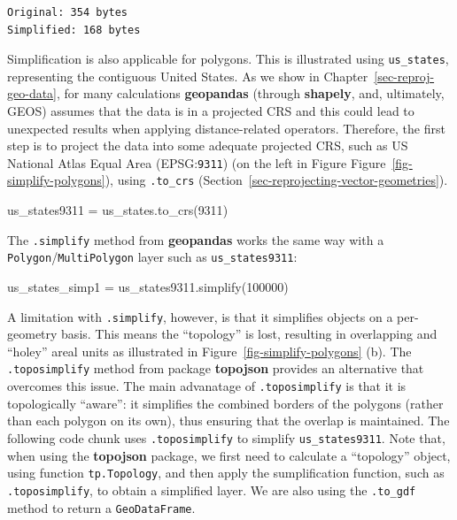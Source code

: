 \documentclass[
  letterpaper,
]{krantz}
\newenvironment{Shaded}{\begin{snugshade}}{\end{snugshade}}
\newcommand{\DecValTok}[1]{\textcolor[rgb]{0.68,0.00,0.00}{#1}}
\newcommand{\NormalTok}[1]{\textcolor[rgb]{0.00,0.23,0.31}{#1}}
\newcommand{\OperatorTok}[1]{\textcolor[rgb]{0.37,0.37,0.37}{#1}}
\begin{document}
\begin{verbatim}
Original: 354 bytes
Simplified: 168 bytes
\end{verbatim}

Simplification is also applicable for polygons. This is illustrated
using \texttt{us\_states}, representing the contiguous United States. As
we show in Chapter~\ref{sec-reproj-geo-data}, for many calculations
\textbf{geopandas} (through \textbf{shapely}, and, ultimately, GEOS)
assumes that the data is in a projected CRS and this could lead to
unexpected results when applying distance-related operators. Therefore,
the first step is to project the data into some adequate projected CRS,
such as US National Atlas Equal Area (EPSG:\texttt{9311}) (on the left
in Figure Figure~\ref{fig-simplify-polygons}), using \texttt{.to\_crs}
(Section~\ref{sec-reprojecting-vector-geometries}).

\begin{Shaded}
\begin{Highlighting}[]
\NormalTok{us\_states9311 }\OperatorTok{=}\NormalTok{ us\_states.to\_crs(}\DecValTok{9311}\NormalTok{)}
\end{Highlighting}
\end{Shaded}

The \texttt{.simplify} method from \textbf{geopandas} works the same way
with a
\texttt{\textquotesingle{}Polygon\textquotesingle{}}/\texttt{\textquotesingle{}MultiPolygon\textquotesingle{}}
layer such as \texttt{us\_states9311}:

\begin{Shaded}
\begin{Highlighting}[]
\NormalTok{us\_states\_simp1 }\OperatorTok{=}\NormalTok{ us\_states9311.simplify(}\DecValTok{100000}\NormalTok{)}
\end{Highlighting}
\end{Shaded}

A limitation with \texttt{.simplify}, however, is that it simplifies
objects on a per-geometry basis. This means the ``topology'' is lost,
resulting in overlapping and ``holey'' areal units as illustrated in
Figure~\ref{fig-simplify-polygons} (b). The \texttt{.toposimplify}
method from package \textbf{topojson} provides an alternative that
overcomes this issue. The main advanatage of \texttt{.toposimplify} is
that it is topologically ``aware'': it simplifies the combined borders
of the polygons (rather than each polygon on its own), thus ensuring
that the overlap is maintained. The following code chunk uses
\texttt{.toposimplify} to simplify \texttt{us\_states9311}. Note that,
when using the \textbf{topojson} package, we first need to calculate a
``topology'' object, using function \texttt{tp.Topology}, and then apply
the sumplification function, such as \texttt{.toposimplify}, to obtain a
simplified layer. We are also using the \texttt{.to\_gdf} method to
return a \texttt{GeoDataFrame}.
\end{document}
